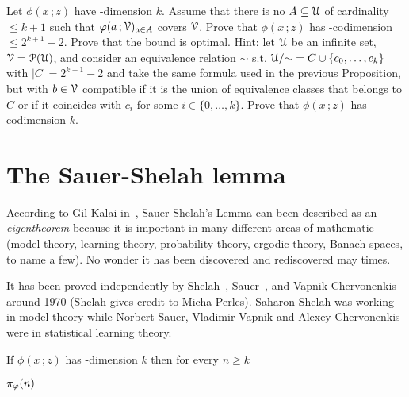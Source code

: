 \documentclass[scombinatorics.tex]{subfiles}
\begin{document}
\begin{exercise}
  Let $\phi(x\,;z)$ have \vc-dimension $k$.
  Assume that there is no $A\subseteq\EuScript U$ of cardinality $\le k+1$ such that $\varphi(a\,;\EuScript V)_{a\in A}$ covers $\EuScript V$.
  Prove that $\phi(x\,;z)$ has \vc-codimension $\le2^{k+1}-2$.
  Prove that the bound is optimal.
  Hint: let $\EuScript U$ be an infinite set, $\EuScript V = \EuScript P(\EuScript U)$, and consider an equivalence relation $\sim$ s.t. $\EuScript U / {\sim} = C \cup \{c_0, \dots, c_k\}$ with $|C| = 2^{k+1}-2$ and take the same formula used in the previous Proposition, but with $b \in \EuScript V$ compatible if it is the union of equivalence classes that belongs to $C$ or if it coincides with $c_i$ for some $i \in \{0,\dots, k\}$.
  Prove that $\phi(x\,;z)$ has \vc-codimension $k$.\QED
\end{exercise}


  


\section{The Sauer-Shelah lemma}\label{sauer}

\def\ceq#1#2#3{\parbox[t]{15ex}{$\displaystyle #1$}\medrel{#2}{$\displaystyle #3$}}

According to Gil Kalai in~\cite{kalai}, Sauer-Shelah's Lemma can been described as an \textit{eigentheorem\/} because it is important in many different areas of mathematic (model theory, learning theory, probability theory, ergodic theory, Banach spaces, to name a few).
No wonder it has been discovered and rediscovered may times.

It has been proved independently by Shelah~\cite{shelah72}, Sauer~\cite{sauer}, and Vapnik-Cher\-vo\-nen\-kis~\cite{VC} around 1970 (Shelah gives credit to Micha Perles).
Saharon Shelah was working in model theory while Norbert Sauer, Vladimir Vapnik and Alexey Chervonenkis were in statistical learning theory.

\begin{void_thm}\label{lem_sauer}
If $\phi(x\,;z)$ has \vc-dimension $k$ then for every $n\ge k$

\ceq{\hfill\pi_\phi(n)}{\le}{\bigsum^{k}_{i=0} \binom{n}{i}.}
\end{void_thm}
\end{document}
